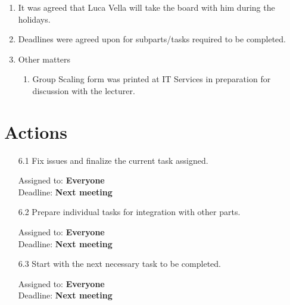 \documentclass{cce2014-meetings}
\begin{document}
\begin{enumerate}
\item It was agreed that Luca Vella will take the board with him during the holidays.

\item Deadlines were agreed upon for subparts/tasks required to be completed.

\item Other matters
   \begin{enumerate}
   \item Group Scaling form was printed at IT Services in preparation for discussion with the lecturer.
   \end{enumerate}

\end{enumerate}

\section*{Actions}

\begin{enumerate}

\item [6.1] Fix issues and finalize the current task assigned.
\begin{flushright}
Assigned to: \textbf{Everyone} \\
Deadline: \textbf{Next meeting}
\end{flushright}

\item [6.2] Prepare individual tasks for integration with other parts.
\begin{flushright}
Assigned to: \textbf{Everyone} \\
Deadline: \textbf{Next meeting}
\end{flushright}

\item [6.3] Start with the next necessary task to be completed.
\begin{flushright}
Assigned to: \textbf{Everyone} \\
Deadline: \textbf{Next meeting}
\end{flushright}


\end{enumerate}
\end{document}
